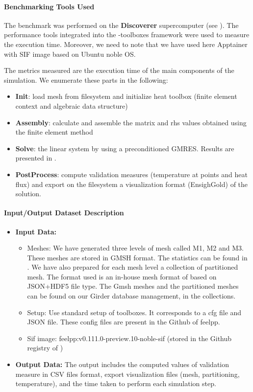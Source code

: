\paragraph{Benchmarking Tools Used}

The benchmark was performed on the \textbf{Discoverer} supercomputer (see
).
The performance tools integrated into the \Feelpp-toolboxes framework were used to measure
the execution time.
Moreover, we need to note that we have used here Apptainer with \Feelpp SIF image based on Ubuntu noble OS.

The metrics measured are the execution time of the main components of the simulation. We enumerate these parts in the following:
\begin{itemize}
\item \textbf{Init}: load mesh from filesystem and initialize heat toolbox (finite element context and algebraic data structure)
\item \textbf{Assembly}: calculate and assemble the matrix and rhs values obtained using the finite element method
\item \textbf{Solve}: the linear system by using a preconditioned GMRES. Results
  are presented in .
\item \textbf{PostProcess}: compute validation measures (temperature at points and
  heat flux) and export on the filesystem a visualization format (EnsighGold) of
  the solution.
\end{itemize}

\paragraph{Input/Output Dataset Description}

\begin{itemize}
\item \textbf{Input Data:}
  \begin{itemize}
  \item Meshes: We have generated three levels of mesh called M1, M2
    and M3. These meshes are stored in GMSH format. The statistics can be found in
    . We have also prepared for
    each mesh level a collection of partitioned mesh.
    The format used is an in-house mesh format of \Feelpp based on
    JSON+HDF5 file type.
    The Gmsh meshes and the partitioned meshes can be found on our Girder
    database management, in the \Feelpp collections.
  \item Setup: Use standard setup of \Feelpp toolboxes. It corresponds to a cfg
    file and JSON file. These config files are present in the Github of feelpp.
  \item Sif image: feelpp:v0.111.0-preview.10-noble-sif  (stored in the Github registry of \Feelpp)
  \end{itemize}
\item \textbf{Output Data:} The output includes the computed values of
  validation measure in CSV files format, export visualization files (mesh, partitioning, temperature), and the time taken to perform each simulation step.
\end{itemize}



